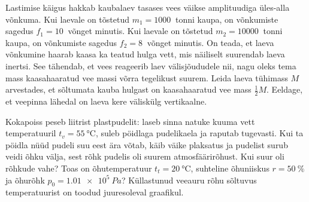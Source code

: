 \documentclass[10pt]{article}
\begin{document}

Lastimise käigus hakkab kaubalaev tasases vees väikse amplituudiga üles-alla võnkuma. Kui laevale on tõstetud $m_1 = \SI{1000}{}$ tonni kaupa, on võnkumiste sagedus $f_1 = \SI{10}{}$ võnget minutis. Kui laevale on tõstetud $m_2 = \SI{10000}{}$ tonni kaupa, on võnkumiste sagedus $f_2 = \SI{8}{}$ võnget minutis. On teada, et laeva võnkumine haarab kaasa ka teatud hulga vett, mis näiliselt suurendab laeva inertsi. See tähendab, et vees reageerib laev välisjõududele nii, nagu oleks tema mass kaasahaaratud vee massi võrra tegelikust suurem. Leida laeva tühimass $M$ arvestades, et sõltumata kauba hulgast on kaasahaaratud vee mass $\frac{1}{2}M$. Eeldage, et veepinna lähedal on laeva kere väliskülg vertikaalne.
\probend
\bigskip


Kokapoiss peseb liitrist plastpudelit: laseb sinna natuke kuuma vett temperatuuril $t_v=\qty{55}{\celsius}$, suleb pöidlaga pudelikaela ja raputab tugevasti. Kui ta pöidla nüüd pudeli suu eest ära võtab, käib väike plaksatus ja pudelist surub veidi õhku välja, sest rõhk pudelis oli suurem atmosfäärirõhust. Kui suur oli rõhkude vahe? Toas on õhutemperatuur $t_t=\qty{20}{\celsius}$, suhteline õhuniiskus $r=\qty{50}{\percent}$ ja õhurõhk $p_0=\SI{1.01e5}{Pa}$? Küllastunud veeauru rõhu sõltuvus temperatuurist on toodud juuresoleval graafikul.
\begin{figure}[h]
  \vspace{-0.5em}
  {
  }
  \vspace{-1em}
\end{figure}
\probend
\bigskip
\end{document}
